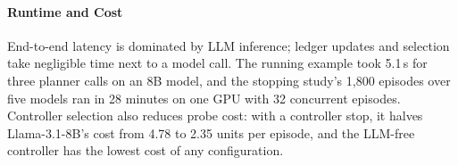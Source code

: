 \paragraph{Runtime and Cost} End-to-end latency is dominated by LLM inference; ledger updates and selection take negligible time next to a model call. The running example took 5.1\,s for three planner calls on an 8B model, and the stopping study's 1{,}800 episodes over five models ran in 28 minutes on one GPU with 32 concurrent episodes. Controller selection also reduces probe cost: with a controller stop, it halves Llama-3.1-8B's cost from 4.78 to 2.35 units per episode, and the LLM-free controller has the lowest cost of any configuration.
